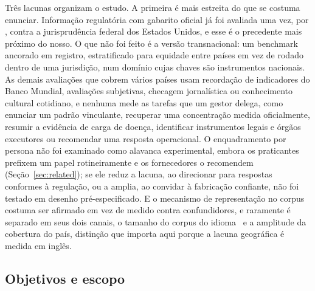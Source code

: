 Três lacunas organizam o estudo. A primeira é mais estreita do que se costuma
enunciar. Informação regulatória com gabarito oficial já foi avaliada uma vez,
por \citet{dahl2024legal}, contra a jurisprudência federal dos Estados Unidos, e
esse é o precedente mais próximo do nosso. O que não foi feito é a versão
transnacional: um benchmark ancorado em registro, estratificado para equidade
entre países em vez de rodado dentro de uma jurisdição, num domínio cujas chaves
são instrumentos nacionais. As demais avaliações que cobrem vários países usam
recordação de indicadores do Banco Mundial, avaliações subjetivas, checagem
jornalística ou conhecimento cultural cotidiano, e nenhuma mede as tarefas que um
gestor delega, como enunciar um padrão vinculante, recuperar uma concentração
medida oficialmente, resumir a evidência de carga de doença, identificar
instrumentos legais e órgãos executores ou recomendar uma resposta operacional. O enquadramento por persona
não foi examinado como alavanca experimental, embora os praticantes prefixem um
papel rotineiramente e os fornecedores o recomendem (Seção~\ref{sec:related});
se ele reduz a lacuna, ao direcionar para respostas conformes à regulação, ou a
amplia, ao convidar à fabricação confiante, não foi testado em desenho
pré-especificado. E o mecanismo de representação no corpus costuma ser afirmado
em vez de medido contra confundidores, e raramente é separado em seus dois
canais, o tamanho do corpus do idioma~\citep{xue2021mt5,abadji2022oscar} e a
amplitude da cobertura do país, distinção que importa aqui porque a lacuna
geográfica é medida em inglês.

\subsection*{Objetivos e escopo}

